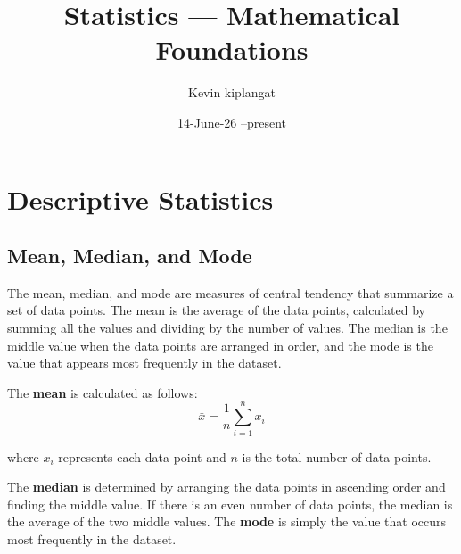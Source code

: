 \documentclass{article}
\title{Statistics --- Mathematical Foundations}
\author{Kevin kiplangat}
\date{14-June-26 --present}
\begin{document}
\maketitle

\section{Descriptive Statistics}

\subsection{Mean, Median, and Mode}
The mean, median, and mode are measures of central tendency that summarize a set of data points. The mean is the average of the data points, calculated by summing all the values and dividing by the number of values. The median is the middle value when the data points are arranged in order, and the mode is the value that appears most frequently in the dataset.

The \textbf{mean} is calculated as follows:
\begin{equation}
\bar{x} = \frac{1}{n} \sum_{i=1}^{n} x_i
\end{equation}

where $x_i$ represents each data point and $n$ is the total number of data points.

The \textbf{median} is determined by arranging the data points in ascending order and finding the middle value. If there is an even number of data points, the median is the average of the two middle values. The \textbf{mode} is simply the value that occurs most frequently in the dataset.    
\end{document}

